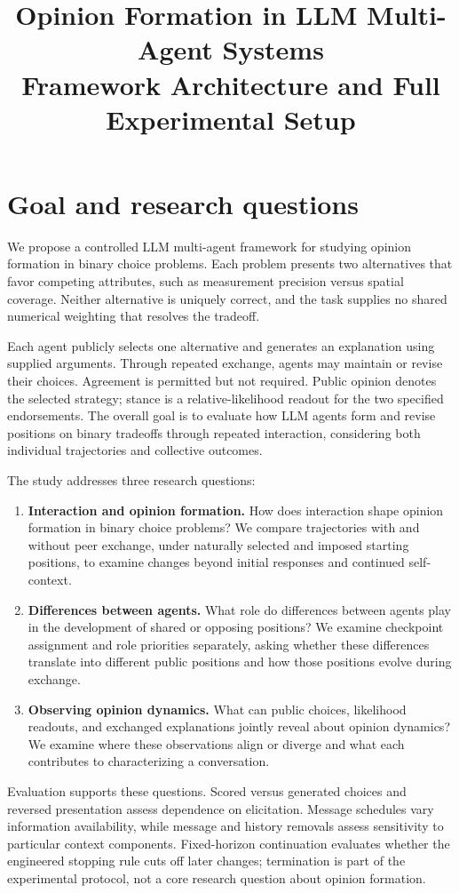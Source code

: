 \documentclass[11pt,a4paper]{article}
\title{Opinion Formation in LLM Multi-Agent Systems\\[4pt]\large Framework Architecture and Full Experimental Setup}
\author{}
\date{}
\begin{document}
\maketitle

\section{Goal and research questions}
We propose a controlled LLM multi-agent framework for studying opinion formation in binary choice problems. Each problem presents two alternatives that favor competing attributes, such as measurement precision versus spatial coverage. Neither alternative is uniquely correct, and the task supplies no shared numerical weighting that resolves the tradeoff.

Each agent publicly selects one alternative and generates an explanation using supplied arguments. Through repeated exchange, agents may maintain or revise their choices. Agreement is permitted but not required. Public opinion denotes the selected strategy; stance is a relative-likelihood readout for the two specified endorsements. The overall goal is to evaluate how LLM agents form and revise positions on binary tradeoffs through repeated interaction, considering both individual trajectories and collective outcomes.

The study addresses three research questions:
\begin{enumerate}
\item \textbf{Interaction and opinion formation.} How does interaction shape opinion formation in binary choice problems? We compare trajectories with and without peer exchange, under naturally selected and imposed starting positions, to examine changes beyond initial responses and continued self-context.
\item \textbf{Differences between agents.} What role do differences between agents play in the development of shared or opposing positions? We examine checkpoint assignment and role priorities separately, asking whether these differences translate into different public positions and how those positions evolve during exchange.
\item \textbf{Observing opinion dynamics.} What can public choices, likelihood readouts, and exchanged explanations jointly reveal about opinion dynamics? We examine where these observations align or diverge and what each contributes to characterizing a conversation.
\end{enumerate}

Evaluation supports these questions. Scored versus generated choices and reversed presentation assess dependence on elicitation. Message schedules vary information availability, while message and history removals assess sensitivity to particular context components. Fixed-horizon continuation evaluates whether the engineered stopping rule cuts off later changes; termination is part of the experimental protocol, not a core research question about opinion formation.
\end{document}
